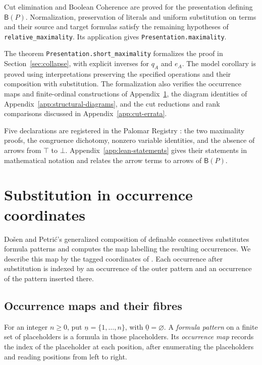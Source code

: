 \documentclass[11pt]{article}
\newcommand{\B}{\mathsf B}
\begin{document}
Cut elimination and Boolean Coherence are proved for the presentation
defining $\B(P)$. Normalization, preservation of literals and
uniform substitution on terms and their source and target formulas
satisfy the remaining hypotheses of \texttt{relative\_maximality}.
Its application gives \texttt{Presentation.maximality}.

The theorem \texttt{Presentation.short\_maximality} formalizes the proof
in Section~\ref{sec:collapse}, with explicit inverses for $q_A$ and $e_A$.
The model corollary is proved using interpretations preserving the
specified operations and their composition with substitution. The formalization
also verifies the occurrence maps and finite-ordinal constructions of
Appendix~\ref{app:substitution}, the diagram identities of
Appendix~\ref{app:structural-diagrams}, and the cut reductions and rank
comparisons discussed in Appendix~\ref{app:cut-errata}.

Five declarations are registered in the Palomar Registry
\cite{palomar-2026-10-30-000014-v1}:
the two maximality proofs, the congruence dichotomy, nonzero variable
identities, and the absence of arrows from $\top$ to $\bot$.
Appendix~\ref{app:lean-statements} gives their statements in mathematical
notation and relates the arrow terms to arrows of $\B(P)$.

\appendix
\section{Substitution in occurrence coordinates}\label{app:substitution}

Do\v{s}en and Petri\'c's generalized composition of definable
connectives \cite[\S2.5, pp.~45--46]{DP} substitutes formula
patterns and computes the map labelling the resulting occurrences.
We describe this map by the tagged coordinates of
\cite[\S\S9.2--9.3]{Notation}. Each occurrence after substitution
is indexed by an occurrence of the outer pattern and an occurrence
of the pattern inserted there.

\subsection{Occurrence maps and their fibres}\label{app:profiles}

For an integer $n\geq0$, put $\underline n=\{1,\ldots,n\}$, with
$\underline0=\varnothing$. A \emph{formula pattern} on a finite set
of placeholders is a formula in those placeholders. Its
\emph{occurrence map} records the index of the placeholder at each position,
after enumerating the placeholders and reading positions from left to right.
\end{document}
